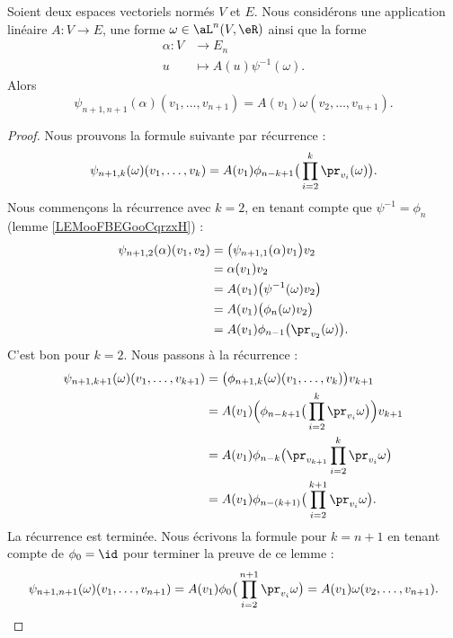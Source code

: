 \begin{lemma}
    Soient deux espaces vectoriels normés \( V\) et \( E\). Nous considérons une application linéaire \( A\colon V\to E\), une forme \( \omega\in\aL^n(V,\eR)\) ainsi que la forme
    \begin{equation}
        \begin{aligned}
            \alpha\colon V&\to E_n \\
            u&\mapsto A(u)\psi^{-1}(\omega).
        \end{aligned}
    \end{equation}
    Alors
    \begin{equation}
        \psi_{n+1,n+1}(\alpha)(v_1,\ldots, v_{n+1})=A(v_1)\omega(v_2,\ldots, v_{n+1}).
    \end{equation}
\end{lemma}

\begin{proof}
    Nous prouvons la formule suivante par récurrence :
    \begin{equation}
        \psi_{n+1,k}(\omega)(v_1,\ldots, v_k)=A(v_1)\phi_{n-k+1}\big( \prod_{i=2}^k\pr_{v_i}(\omega) \big).
    \end{equation}
    Nous commençons la récurrence avec \( k=2\), en tenant compte que \( \psi^{-1}=\phi_n\) (lemme \ref{LEMooFBEGooCqrzxH}) :
    \begin{subequations}
        \begin{align}
            \psi_{n+1,2}(\alpha)(v_1,v_2)&=\big( \psi_{n+1,1}(\alpha)v_1 \big)v_2\\
            &=\alpha(v_1)v_2\\
            &=A(v_1)\big( \psi^{-1}(\omega)v_2 \big)\\
            &=A(v_1)\big( \phi_n(\omega)v_2 \big)\\
            &=A(v_1)\phi_{n-1}\big( \pr_{v_2}(\omega) \big).
        \end{align}
    \end{subequations}
    C'est bon pour \( k=2\). Nous passons à la récurrence :
    \begin{subequations}
        \begin{align}
            \psi_{n+1,k+1}(\omega)(v_1,\ldots, v_{k+1})&=\big( \phi_{n+1,k}(\omega)(v_1,\ldots, v_k) \big)v_{k+1}\\
            &=A(v_1)\Big( \phi_{n-k+1}\big( \prod_{i=2}^k\pr_{v_i}\omega \big) \Big)v_{k+1}\\
            &=A(v_1)\phi_{n-k}\big( \pr_{v_{k+1}}\prod_{i=2}^k\pr_{v_i}\omega \big)\\
            &=A(v_1)\phi_{n-(k+1)}\big( \prod_{i=2}^{k+1}\pr_{v_i}\omega \big).
        \end{align}
    \end{subequations}
    La récurrence est terminée. Nous écrivons la formule pour \( k=n+1\) en tenant compte de \( \phi_0=\id\) pour terminer la preuve de ce lemme :
    \begin{equation}
        \psi_{n+1,n+1}(\omega)(v_1,\ldots, v_{n+1})=A(v_1)\phi_0\big( \prod_{i=2}^{n+1}\pr_{v_i}\omega \big)=A(v_1)\omega(v_2,\ldots, v_{n+1}).
    \end{equation}
\end{proof}

